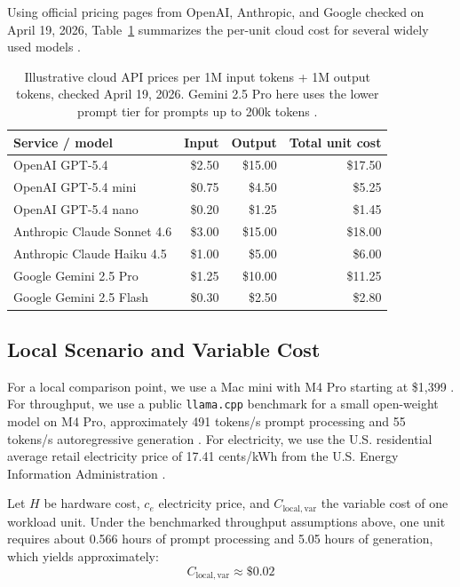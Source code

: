 \documentclass[11pt,a4paper]{article}
\begin{document}
Using official pricing pages from OpenAI, Anthropic, and Google checked on April 19, 2026, Table~\ref{tab:api_costs} summarizes the per-unit cloud cost for several widely used models \cite{openai_pricing_2026, anthropic_pricing_2026, google_pricing_2026}.

\begin{table}[t]
\centering
\small
\begin{tabular}{>{\raggedright\arraybackslash}p{3.0cm} r r r}
\toprule
\textbf{Service / model} & \textbf{Input} & \textbf{Output} & \textbf{Total unit cost} \\
\midrule
OpenAI GPT-5.4 & \$2.50 & \$15.00 & \$17.50 \\
OpenAI GPT-5.4 mini & \$0.75 & \$4.50 & \$5.25 \\
OpenAI GPT-5.4 nano & \$0.20 & \$1.25 & \$1.45 \\
Anthropic Claude Sonnet 4.6 & \$3.00 & \$15.00 & \$18.00 \\
Anthropic Claude Haiku 4.5 & \$1.00 & \$5.00 & \$6.00 \\
Google Gemini 2.5 Pro & \$1.25 & \$10.00 & \$11.25 \\
Google Gemini 2.5 Flash & \$0.30 & \$2.50 & \$2.80 \\
\bottomrule
\end{tabular}
\caption{Illustrative cloud API prices per 1M input tokens + 1M output tokens, checked April 19, 2026. Gemini 2.5 Pro here uses the lower prompt tier for prompts up to 200k tokens \cite{google_pricing_2026}.}
\label{tab:api_costs}
\end{table}

\subsection{Local Scenario and Variable Cost}

For a local comparison point, we use a Mac mini with M4 Pro starting at \$1,399 \cite{apple_macmini_2024}. For throughput, we use a public \texttt{llama.cpp} benchmark for a small open-weight model on M4 Pro, approximately 491 tokens/s prompt processing and 55 tokens/s autoregressive generation \cite{llamacpp_m4pro_bench}. For electricity, we use the U.S. residential average retail electricity price of 17.41 cents/kWh from the U.S. Energy Information Administration \cite{eia_2025}.

Let $H$ be hardware cost, $c_e$ electricity price, and $C_{\mathrm{local,var}}$ the variable cost of one workload unit. Under the benchmarked throughput assumptions above, one unit requires about 0.566 hours of prompt processing and 5.05 hours of generation, which yields approximately:
\begin{equation}
C_{\mathrm{local,var}} \approx \$0.02
\end{equation}
\end{document}
